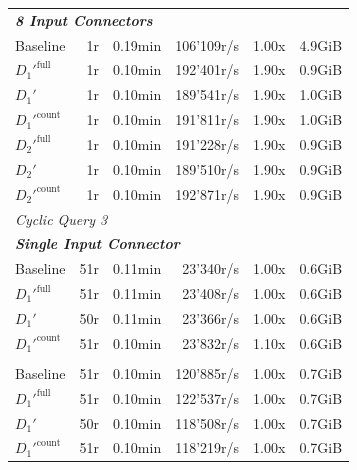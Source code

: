 \begin{longtable}{lrrrrr}
    \multicolumn{6}{l}{\textit{\textbf{8 Input Connectors}}} \\
    \nopagebreak
    Baseline              &  1r                   &  0.19min            &  106'109r/s          & 1.00x             & 4.9GiB    \\
    $D_1'^{\text{full}}$   &  1r                   &  0.10min            &  192'401r/s          & 1.90x             & 0.9GiB    \\
    \quad $D_1'$           &  1r                   &  0.10min            &  189'541r/s          & 1.90x             & 1.0GiB    \\
    $D_1'^{\text{count}}$  &  1r                   &  0.10min            &  191'811r/s          & 1.90x             & 1.0GiB    \\
    $D_2'^{\text{full}}$   &  1r                   &  0.10min            &  191'228r/s          & 1.90x             & 0.9GiB    \\
    \quad $D_2'$           &  1r                   &  0.10min            &  189'510r/s          & 1.90x             & 0.9GiB    \\
    $D_2'^{\text{count}}$  &  1r                   &  0.10min            &  192'871r/s          & 1.90x             & 0.9GiB    \\
    \midrule
    
    \multicolumn{6}{l}{\textit{Cyclic Query 3}} \\
    \midrule
    \multicolumn{6}{l}{\textit{\textbf{Single Input Connector}}} \\
    \nopagebreak
    Baseline              &  51r                  &  0.11min             &  23'340r/s           & 1.00x             & 0.6GiB    \\
    $D_1'^{\text{full}}$   &  51r                  &  0.11min             &  23'408r/s           & 1.00x             & 0.6GiB    \\
    \quad $D_1'$           &  50r                  &  0.11min             &  23'366r/s           & 1.00x             & 0.6GiB    \\
    $D_1'^{\text{count}}$  &  51r                  &  0.10min             &  23'832r/s           & 1.10x             & 0.6GiB    \\
    \addlinespace 
    
    \multicolumn{6}{l}{\textit{\textbf{5 Input Connectors}}} \\
    \nopagebreak
    Baseline              &  51r                  &  0.10min             &  120'885r/s          & 1.00x             & 0.7GiB    \\
    $D_1'^{\text{full}}$   &  51r                  &  0.10min             &  122'537r/s          & 1.00x             & 0.7GiB    \\
    \quad $D_1'$           &  50r                  &  0.10min             &  118'508r/s          & 1.00x             & 0.7GiB    \\
    $D_1'^{\text{count}}$  &  51r                  &  0.10min             &  118'219r/s          & 1.00x             & 0.7GiB    \\
    \midrule
    

\end{longtable}
